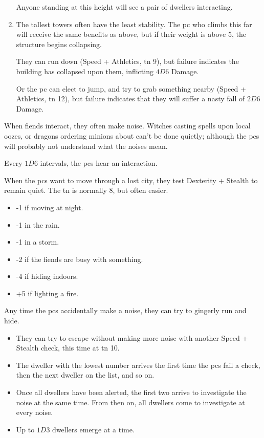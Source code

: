 \begin{multicols}{2}
\begin{enumerate}
  Anyone standing at this height will see a pair of dwellers interacting.
  \item
  The tallest towers often have the least stability.
  The \gls{pc} who climbs this far will receive the same benefits as above, but if their \gls{weight} is above 5, the structure begins collapsing.

  They can run down (Speed + Athletics, \gls{tn} 9), but failure indicates the building has collapsed upon them, inflicting $4D6$ Damage.

  Or the \gls{pc} can elect to jump, and try to grab something nearby (Speed + Athletics, \gls{tn} 12), but failure indicates that they will suffer a nasty fall of $2D6$ Damage.
\end{enumerate}

\label{lostCries}

When fiends interact, they often make noise.
Witches casting spells upon local oozes, or dragons ordering minions about can't be done quietly; although the \glspl{pc} will probably not understand what the noises mean.

Every $1D6$ \glspl{interval}, the \glspl{pc} hear an interaction.

\label{lostWhispers}

When the \glspl{pc} want to move through a lost city, they test Dexterity + Stealth to remain quiet.
The \gls{tn} is normally 8, but often easier.

\begin{itemize}
  \item
  -1 if moving at night.
  \item
  -1 in the rain.
  \item
  -1 in a storm.
  \item
  -2 if the fiends are busy with something.
  \item
  -4 if hiding indoors.
  \item
  +5 if lighting a fire.
\end{itemize}

\label{lostChase}

Any time the \glspl{pc} accidentally make a noise, they can try to gingerly run and hide.

\begin{itemize}
  \item
  They can try to escape without making more noise with another Speed + Stealth check, this time at \gls{tn} 10.
  \item
  The dweller with the lowest number arrives the first time the \glspl{pc} fail a check, then the next dweller on the list, and so on.
  \item
  Once all dwellers have been alerted, the first two arrive to investigate the noise at the same time.
  From then on, all dwellers come to investigate at every noise.
  \item
  Up to $1D3$ dwellers emerge at a time.
\end{itemize}


\end{multicols}
